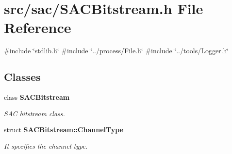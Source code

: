 \section{src/sac/\+S\+A\+C\+Bitstream.h File Reference}
\label{_s_a_c_bitstream_8h}
{\ttfamily \#include \char`\"{}stdlib.\+h\char`\"{}}\newline
{\ttfamily \#include \char`\"{}../process/\+File.\+h\char`\"{}}\newline
{\ttfamily \#include \char`\"{}../tools/\+Logger.\+h\char`\"{}}\newline
\subsection*{Classes}
\begin{DoxyCompactItemize}
\item 
class \textbf{ S\+A\+C\+Bitstream}
\begin{DoxyCompactList}\small\item\em S\+AC bitstream class. \end{DoxyCompactList}\item 
struct \textbf{ S\+A\+C\+Bitstream\+::\+Channel\+Type}
\begin{DoxyCompactList}\small\item\em It specifies the channel type. \end{DoxyCompactList}\end{DoxyCompactItemize}
